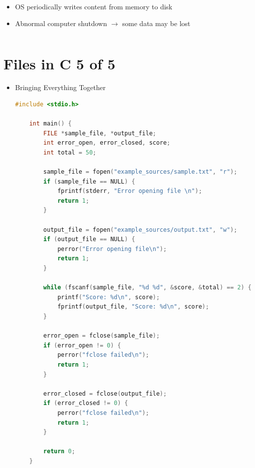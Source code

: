 \documentclass[12pt]{article}
\begin{document}
\begin{itemize}
\begin{itemize}
        \begin{itemize}
            \item OS periodically writes content from memory to disk
            \item Abnormal computer shutdown $\to$ some data may be lost
        \end{itemize}
    \end{itemize}

    \begin{lstlisting}[language=c]

    \end{lstlisting}
\end{itemize}

\bigskip

\section*{Files in C 5 of 5}

\bigskip

\begin{itemize}
    \item Bringing Everything Together

    \begin{lstlisting}[language=c,caption={files\_example\_5.c}]
    #include <stdio.h>

    int main() {
        FILE *sample_file, *output_file;
        int error_open, error_closed, score;
        int total = 50;

        sample_file = fopen("example_sources/sample.txt", "r");
        if (sample_file == NULL) {
            fprintf(stderr, "Error opening file \n");
            return 1;
        }

        output_file = fopen("example_sources/output.txt", "w");
        if (output_file == NULL) {
            perror("Error opening file\n");
            return 1;
        }

        while (fscanf(sample_file, "%d %d", &score, &total) == 2) {
            printf("Score: %d\n", score);
            fprintf(output_file, "Score: %d\n", score);
        }

        error_open = fclose(sample_file);
        if (error_open != 0) {
            perror("fclose failed\n");
            return 1;
        }

        error_closed = fclose(output_file);
        if (error_closed != 0) {
            perror("fclose failed\n");
            return 1;
        }

        return 0;
    }
    \end{lstlisting}

\end{itemize}
\end{document}
